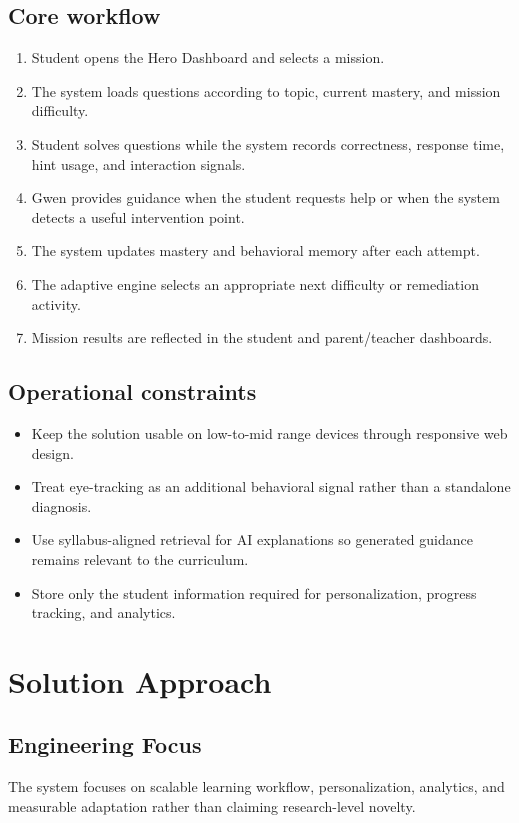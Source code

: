 \documentclass[11pt]{article}
\begin{document}
\subsection{Core workflow}
\begin{enumerate}
    \item Student opens the Hero Dashboard and selects a mission.
    \item The system loads questions according to topic, current mastery, and mission difficulty.
    \item Student solves questions while the system records correctness, response time, hint usage, and interaction signals.
    \item Gwen provides guidance when the student requests help or when the system detects a useful intervention point.
    \item The system updates mastery and behavioral memory after each attempt.
    \item The adaptive engine selects an appropriate next difficulty or remediation activity.
    \item Mission results are reflected in the student and parent/teacher dashboards.
\end{enumerate}

\subsection{Operational constraints}
\begin{itemize}
    \item Keep the solution usable on low-to-mid range devices through responsive web design.
    \item Treat eye-tracking as an additional behavioral signal rather than a standalone diagnosis.
    \item Use syllabus-aligned retrieval for AI explanations so generated guidance remains relevant to the curriculum.
    \item Store only the student information required for personalization, progress tracking, and analytics.
\end{itemize}

\section{Solution Approach}
\subsection*{Engineering Focus}
The system focuses on scalable learning workflow, personalization, analytics, and measurable adaptation rather than claiming research-level novelty.
\end{document}
